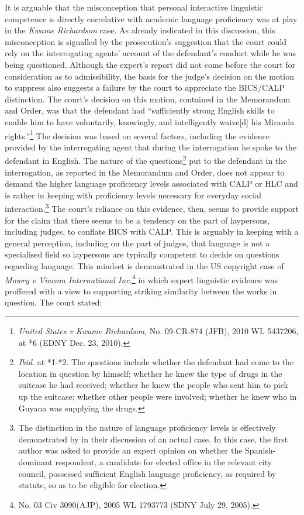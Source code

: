 \documentclass[output=paper,colorlinks,citecolor=brown]{langscibook}
\begin{document}
It is arguable that the misconception that personal interactive linguistic competence is directly correlative with academic language proficiency was at play in the \emph{Kwame Richardson} case. As already indicated in this discussion, this misconception is signalled by the prosecution’s suggestion that the court could rely on the interrogating agents’ account of the defendant’s conduct while he was being questioned. Although the expert’s report did not come before the court for consideration as to admissibility, the basis for the judge’s decision on the motion to suppress also suggests a failure by the court to appreciate the BICS/CALP distinction. The court’s decision on this motion, contained in the Memorandum and Order, was that the defendant had “sufficiently strong English skills to enable him to have voluntarily, knowingly, and intelligently waive[d] his Miranda rights.”\footnote{\emph{United States v Kwame Richardson}, No. 09-CR-874 (JFB), 2010 WL 5437206, at *6 (EDNY Dec. 23, 2010).} The decision was based on several factors, including the evidence provided by the interrogating agent that during the interrogation he spoke to the defendant in English. The nature of the questions\footnote{\emph{Ibid}. at *1-*2. The questions include whether the defendant had come to the location in question by himself; whether he knew the type of drugs in the suitcase he had received; whether he knew the people who sent him to pick up the suitcase; whether other people were involved; whether he knew who in Guyana was supplying the drugs.} put to the defendant in the interrogation, as reported in the Memorandum and Order, does not appear to demand the higher language proficiency levels associated with CALP or HLC and is rather in keeping with proficiency levels necessary for everyday social interaction.\footnote{The distinction in the nature of language proficiency levels is effectively demonstrated by \citet[142--145]{EggingtonCox2013} in their discussion of an actual case. In this case, the first author was asked to provide an expert opinion on whether the Spanish-dominant respondent, a candidate for elected office in the relevant city council, possessed sufficient English language proficiency, as required by statute, so as to be eligible for election.} The court’s reliance on this evidence, then, seems to provide support for the claim that there seems to be a tendency on the part of laypersons, including judges, to conflate BICS with CALP. This is arguably in keeping with a general perception, including on the part of judges, that language is not a specialised field so laypersons are typically competent to decide on questions regarding language. This mindset is demonstrated in the US copyright case of \emph{Mowry v Viacom International Inc,}\footnote{No. 03 Civ 3090(AJP), 2005 WL 1793773 (SDNY July 29, 2005).} in which expert linguistic evidence was proffered with a view to supporting striking similarity between the works in question. The court stated:
\end{document}
